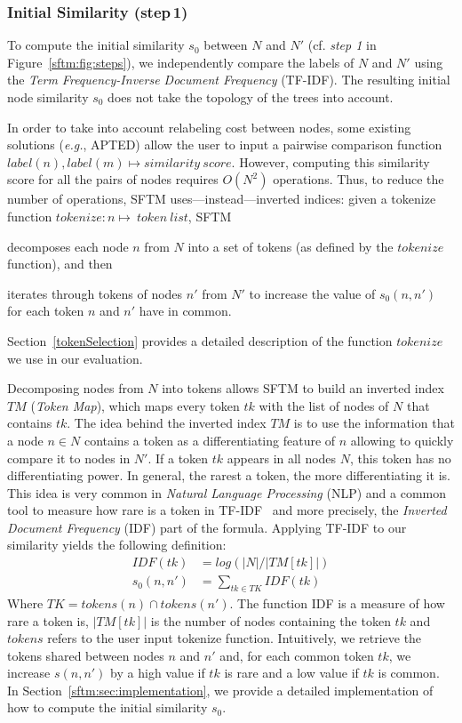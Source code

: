 \subsubsection{Initial Similarity (step\,1)}
To compute the initial similarity $s_0$ between $N$ and $N'$ (cf. \textit{step 1} in Figure~\ref{sftm:fig:steps}), we independently compare the labels of $N$ and $N'$ using the \emph{Term Frequency-Inverse Document Frequency} (TF-IDF).
The resulting initial node similarity $s_0$ does not take the topology of the trees into account.

In order to take into account relabeling cost between nodes, some existing solutions (\emph{e.g.}, APTED) allow the user to input a pairwise comparison function $label(n), label(m) \mapsto similarity\ score$.
However, computing this similarity score for all the pairs of nodes requires $O(N^2)$ operations.
Thus, to reduce the number of operations, SFTM uses---instead---inverted indices: given a tokenize function $tokenize : n \mapsto \ token\ list$, SFTM
\begin{inparaenum}
	\item decomposes each node $n$ from $N$ into a set of tokens (as defined by the $tokenize$ function), and then
    \item iterates through tokens of nodes $n'$ from $N'$ to increase the value of $s_0(n,n')$ for each token $n$ and $n'$ have in common.
\end{inparaenum}
Section~\ref{tokenSelection} provides a detailed description of the function $tokenize$ we use in our evaluation.

Decomposing nodes from $N$ into tokens allows SFTM to build an inverted index $TM$ (\emph{Token Map}), which maps every token $tk$ with the list of nodes of $N$ that contains $tk$.
The idea behind the inverted index $TM$ is to use the information that a node $n \in N$ contains a token as a differentiating feature of $n$ allowing to quickly compare it to nodes in $N'$.
If a token $tk$ appears in all nodes $N$, this token has no differentiating power.
In general, the rarest a token, the more differentiating it is.
This idea is very common in \emph{Natural Language Processing} (NLP) and a common tool to measure how rare is a token in TF-IDF~\cite{jones1972statistical} and more precisely, the \emph{Inverted Document Frequency} (IDF) part of the formula.
Applying TF-IDF to our similarity yields the following definition:
\begin{align}
	IDF(tk) &= log(|N|/|TM[tk]|) \\
	s_0(n,n') &= \sum_{tk \in TK}IDF(tk)
\end{align}
Where $TK=tokens(n) \cap tokens(n')$.
The function IDF is a measure of how rare a token is, $|TM[tk]|$ is the number of nodes containing the token $tk$ and $tokens$ refers to the user input tokenize function.
Intuitively, we retrieve the tokens shared between nodes $n$ and $n'$ and, for each common token $tk$, we increase $s(n,n')$ by a high value if $tk$ is rare and a low value if $tk$ is common.
In Section~\ref{sftm:sec:implementation}, we provide a detailed implementation of how to compute the initial similarity $s_0$.

